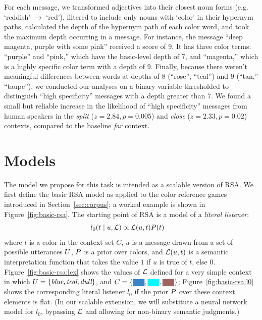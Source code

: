 \documentclass[11pt,letterpaper]{article}
\newcommand{\term}{\textit}
\newcommand{\word}{\textit}
\newcommand{\utt}{u}
\newcommand{\context}{C}
\newcommand{\target}{t}
\renewcommand{\|}{\mid}
\newcommand{\set}[1]{\left\{#1\right\}}
\newcommand{\secref}[1]{Section~\ref{#1}}
\newcommand{\Figref}[1]{Figure~\ref{#1}}
\newcommand{\figref}[1]{Figure~\ref{#1}}
\newcommand{\colorPatch}[2][xxxx]{
  \colorbox[HTML]{#2}{{\color[HTML]{#2}#1}}}
\newcommand{\colorContextNarrow}[3]{
  \colorPatch[xx]{#1}, \colorPatch[xx]{#2}, \colorPatch[xx]{#3}}
\newcommand{\cond}{\emph}
\begin{document}
For each message, we transformed adjectives into their closest noun forms (e.g. `reddish' $\rightarrow$ `red'), filtered to include only nouns with `color' in their hypernym paths, calculated the depth of the hypernym path of each color word, and took the maximum depth occurring in a message. For instance, the message ``deep magenta, purple with some pink'' received a score of 9. It has three color terms: ``purple'' and ``pink,'' which have the basic-level depth of 7, and ``magenta,'' which is a highly specific color term with a depth of 9. Finally, because there weren't meaningful differences between words at depths of 8 (``rose'', ``teal'') and 9 (``tan,'' ``taupe''), we conducted our analyses on a binary variable thresholded to distinguish ``high specificity'' messages with a depth greater than 7.
We found a small but reliable increase in the likelihood of ``high specificity'' messages from human speakers in the \cond{split}  ($z = 2.84, p = 0.005$) and \cond{close}  ($z = 2.33, p = 0.02$) contexts, compared to the baseline \cond{far} context.

\section{Models}

The model we propose for this task is intended as a scalable version of RSA.
We first define the basic RSA model as applied to the
color reference games introduced in \secref{sec:corpus}; a worked example
is shown in \figref{fig:basic-rsa}. The starting point of RSA is a model
of a \term{literal listener}:
\begin{align}
  l_{0}(\target \| \utt, \Lex)
  &\propto
  \Lex(\utt, \target) \targetPrior(\target)
\end{align}
where $\target$ is a color in the context
set $\context$, $\utt$ is a message drawn from a set of possible
utterances $U$, $P$ is a prior over colors,
and $\Lex(\utt, \target)$ is a semantic interpretation function that
takes the value $1$ if $\utt$ is true of $\target$, else $0$.
\Figref{fig:basic-rsa:lex} shows the values of $\mathcal{L}$ defined for
a very simple context in which $\Messages=\set{\word{blue},
  \word{teal}, \word{dull}}$, and $\context =
\set{\colorContextNarrow{3884C7}{02F9FD}{9E6461}{}}$;
\figref{fig:basic-rsa:l0} shows the corresponding literal listener
$l_0$ if the prior $P$ over these context elements is flat.
(In our scalable extension, we will substitute a neural network model for $l_0$,
bypassing $\mathcal{L}$ and allowing for non-binary semantic judgments.)
\end{document}
